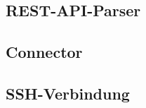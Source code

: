
\subsection{REST-API-Parser}\label{sec:restParser}


\subsection{Connector}\label{sec:Connector}


\subsection{SSH-Verbindung}\label{sec:sshConnection}

